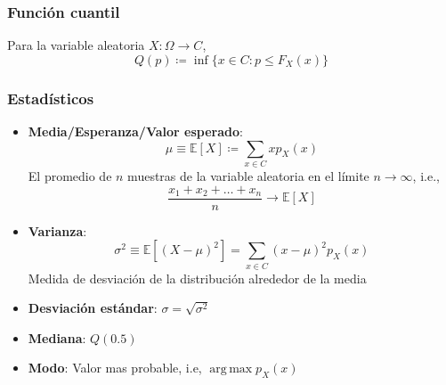 \documentclass[xcolor=dvipsnames,10pt]{beamer}
\begin{document}
\begin{frame}
  \frametitle{Función cuantil}
  Para la variable aleatoria $X \colon \Omega \to C$,
  \begin{equation*}
    Q(p) \coloneqq \inf \{ x \in C\colon p \leq F_X(x) \}
  \end{equation*}
\end{frame}
%
\begin{frame}
  \frametitle{Estadísticos}
  \begin{itemize}
  \item \textbf{Media/Esperanza/Valor esperado}:
    \begin{equation*}
      \mu \equiv \mathbb{E}[X] \coloneqq \sum_{x \in C} x p_X(x)
    \end{equation*}
    El promedio de $n$ muestras de la variable aleatoria en el límite $n \to \infty$, i.e.,
    \begin{equation*}
      \frac{x_1 + x_2 + \dots + x_n}{n} \to \mathbb{E}[X]
    \end{equation*}
  \item \textbf{Varianza}:
    \begin{equation*}
      \sigma^2 \equiv \mathbb{E} \left [ \left (X - \mu \right )^2 \right ] = \sum_{x \in C} (x - \mu)^2 p_X(x)
    \end{equation*}
    Medida de desviación de la distribución alrededor de la media
  \item \textbf{Desviación estándar}: $\sigma = \sqrt{\sigma^2}$
  \item \textbf{Mediana}: $Q(0.5)$
  \item \textbf{Modo}: Valor mas probable, i.e, $\operatorname{arg\,max} p_X(x)$
  \end{itemize}
\end{frame}
%
\end{document}
